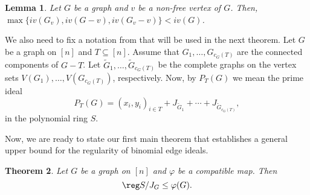 \documentclass[12pt]{amsart}
\newtheorem{Theorem}{Theorem}[section]
\newtheorem{Lemma}[Theorem]{Lemma}
\begin{document}
\begin{Lemma}{\cite[Lemma~3.4]{Kumar}}\label{simplicial}
Let $G$ be a graph and $v$ be a non-free vertex of $G$. Then, 
$\max\{iv(G_v), iv(G-v), iv(G_{v}-v)\}< iv(G)$.
\end{Lemma}

We also need to fix a notation from \cite{HHHKR} that will be used in the next theorem. Let $G$ be a graph on $[n]$ and $T\subseteq [n]$. Assume that $G_1 , \ldots , G_{c_G(T)}$ are the connected components of $G-T$. Let $\widetilde{G}_1 , \ldots , \widetilde{G}_{c_G(T)}$ be the complete graphs on the vertex sets $V(G_1), \ldots , V(G_{c_G(T)})$, respectively. Now, by $P_T(G)$ we mean the prime ideal 
\[
P_T(G)=(x_i,y_i)_{i\in T} +J_{\widetilde{G}_1}+\cdots +J_{\widetilde{G}_{c_G(T)}},
\]
in the polynomial ring $S$.

Now, we are ready to state our first main theorem that establishes a general upper bound for the regularity of binomial edge ideals. 	
\begin{Theorem}\label{main1}
Let $G$ be a graph on $[n]$ and $\varphi$ be a compatible map. Then 
$$\reg S/J_G\leq \varphi(G).$$
\end{Theorem}	
\end{document}
